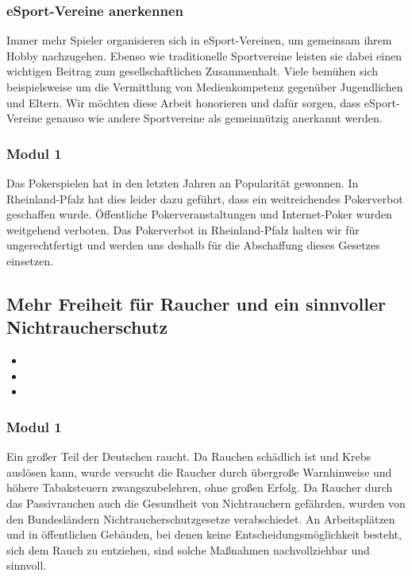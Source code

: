 \subsubsection{eSport-Vereine anerkennen}
\abstimmung
Immer mehr Spieler organisieren sich in eSport-Vereinen, um gemeinsam ihrem Hobby nachzugehen. Ebenso wie traditionelle Sportvereine leisten sie dabei einen wichtigen Beitrag zum gesellschaftlichen Zusammenhalt. Viele bemühen sich beispielsweise um die Vermittlung von Medienkompetenz gegenüber Jugendlichen und Eltern. Wir möchten diese Arbeit honorieren und dafür sorgen, dass eSport-Vereine genauso wie andere Sportvereine als gemeinnützig anerkannt werden.


\subsubsection{Modul 1}
\abstimmung
Das Pokerspielen hat in den letzten Jahren an Popularität gewonnen. In Rheinland-Pfalz hat dies leider dazu geführt, dass ein weitreichendes Pokerverbot geschaffen wurde. Öffentliche Pokerveranstaltungen und Internet-Poker wurden weitgehend verboten. Das Pokerverbot in Rheinland-Pfalz halten wir für ungerechtfertigt und werden uns deshalb für die Abschaffung dieses Gesetzes einsetzen.
 
\subsection*{Mehr Freiheit für Raucher und ein sinnvoller Nichtraucherschutz}
\label{wp:selbst:raucher1}
\begin{itemize}
\item {}
\item {}
\item {}
\end{itemize}

\subsubsection{Modul 1}
\abstimmung
Ein großer Teil der Deutschen raucht. Da Rauchen schädlich ist und Krebs auslösen kann, wurde versucht die Raucher durch übergroße Warnhinweise und höhere Tabaksteuern zwangszubelehren, ohne großen Erfolg. Da Raucher durch das Passivrauchen auch die Gesundheit von Nichtrauchern gefährden, wurden von den Bundesländern Nichtraucherschutzgesetze verabschiedet. An Arbeitsplätzen und in öffentlichen Gebäuden, bei denen keine Entscheidungsmöglichkeit besteht, sich dem Rauch zu entziehen, sind solche Maßnahmen nachvollziehbar und sinnvoll.

